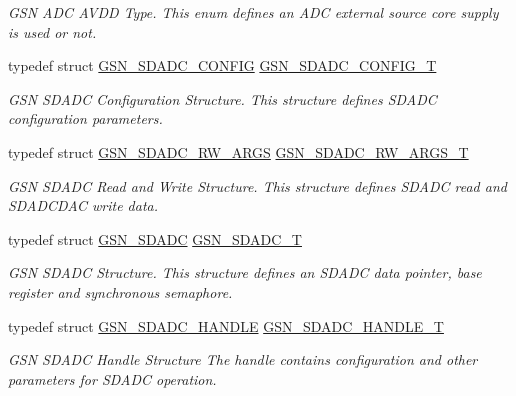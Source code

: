 \begin{DoxyCompactItemize}
\begin{DoxyCompactList}\small\item\em GSN ADC AVDD Type. This enum defines an ADC external source core supply is used or not. \end{DoxyCompactList}\item 
typedef struct \hyperlink{a00213}{GSN\_\-SDADC\_\-CONFIG} \hyperlink{a00652_ga74fd69b30c22ac53de45e0914b171164}{GSN\_\-SDADC\_\-CONFIG\_\-T}
\begin{DoxyCompactList}\small\item\em GSN SDADC Configuration Structure. This structure defines SDADC configuration parameters. \end{DoxyCompactList}\item 
typedef struct \hyperlink{a00215}{GSN\_\-SDADC\_\-RW\_\-ARGS} \hyperlink{a00652_ga9a25b59de94ab9eb590861d864697679}{GSN\_\-SDADC\_\-RW\_\-ARGS\_\-T}
\begin{DoxyCompactList}\small\item\em GSN SDADC Read and Write Structure. This structure defines SDADC read and SDADCDAC write data. \end{DoxyCompactList}\item 
typedef struct \hyperlink{a00212}{GSN\_\-SDADC} \hyperlink{a00652_ga24812a09f6831a451bf951bbc956b2b9}{GSN\_\-SDADC\_\-T}
\begin{DoxyCompactList}\small\item\em GSN SDADC Structure. This structure defines an SDADC data pointer, base register and synchronous semaphore. \end{DoxyCompactList}\item 
typedef struct \hyperlink{a00214}{GSN\_\-SDADC\_\-HANDLE} \hyperlink{a00652_ga1c9d36e9faa624275bd36abfa94ac41f}{GSN\_\-SDADC\_\-HANDLE\_\-T}
\begin{DoxyCompactList}\small\item\em GSN SDADC Handle Structure The handle contains configuration and other parameters for SDADC operation. \end{DoxyCompactList}\end{DoxyCompactItemize}
